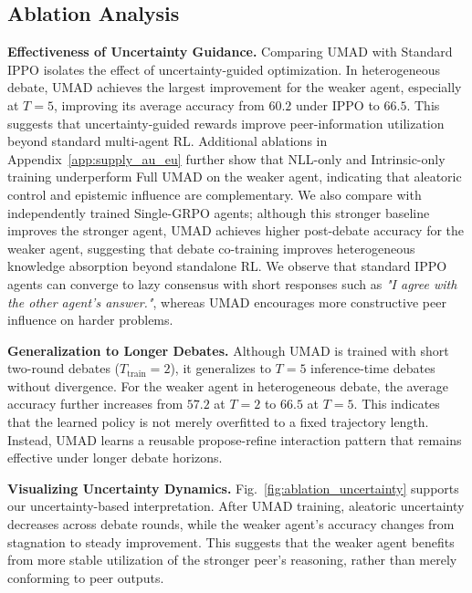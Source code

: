 \documentclass{article}
\theoremstyle{plain}
\theoremstyle{definition}
\theoremstyle{remark}
\begin{document}
\subsection{Ablation Analysis}
\textbf{Effectiveness of Uncertainty Guidance.}
Comparing UMAD with Standard IPPO isolates the effect of uncertainty-guided optimization. In heterogeneous debate, UMAD achieves the largest improvement for the weaker agent, especially at $T=5$, improving its average accuracy from $60.2$ under IPPO to $66.5$. This suggests that uncertainty-guided rewards improve peer-information utilization beyond standard multi-agent RL. Additional ablations in Appendix~\ref{app:supply_au_eu} further show that NLL-only and Intrinsic-only training underperform Full UMAD on the weaker agent, indicating that aleatoric control and epistemic influence are complementary. We also compare with independently trained Single-GRPO agents; although this stronger baseline improves the stronger agent, UMAD achieves higher post-debate accuracy for the weaker agent, suggesting that debate co-training improves heterogeneous knowledge absorption beyond standalone RL. We observe that standard IPPO agents can converge to lazy consensus with short responses such as \textit{"I agree with the other agent's answer."}, whereas UMAD encourages more constructive peer influence on harder problems.


\textbf{Generalization to Longer Debates.}
Although UMAD is trained with short two-round debates ($T_{\mathrm{train}}=2$), it generalizes to $T=5$ inference-time debates without divergence. For the weaker agent in heterogeneous debate, the average accuracy further increases from $57.2$ at $T=2$ to $66.5$ at $T=5$. This indicates that the learned policy is not merely overfitted to a fixed trajectory length. Instead, UMAD learns a reusable propose-refine interaction pattern that remains effective under longer debate horizons.

\textbf{Visualizing Uncertainty Dynamics.}
Fig.~\ref{fig:ablation_uncertainty} supports our uncertainty-based interpretation. After UMAD training, aleatoric uncertainty decreases across debate rounds, while the weaker agent's accuracy changes from stagnation to steady improvement. This suggests that the weaker agent benefits from more stable utilization of the stronger peer's reasoning, rather than merely conforming to peer outputs.
\end{document}
